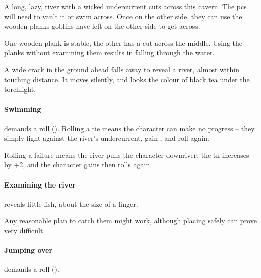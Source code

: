 \begin{multicols}{2}

A long, lazy, river with a wicked undercurrent cuts across this cavern.
The \glspl{pc} will need to vault it or swim across.
Once on the other side, they can use the wooden planks goblins have left on the other side to get across.

One wooden plank is stable, the other has a cut across the middle.
Using the planks without examining them results in  falling through the water.

\begin{boxtext}
  A wide crack in the ground ahead falls away to reveal a river, almost within touching distance.
  It moves silently, and looks the colour of black tea under the torchlight.
\end{boxtext}

\paragraph{Swimming}
demands a  roll (\tn[10]).
Rolling a tie means the character can make no progress -- they simply fight against the river's undercurrent, gain , and roll again.

Rolling a failure means the river pulls the character downriver, the \gls{tn} increases by +2, and the character gains  then rolls again.

\paragraph{Examining the river}
reveals little fish, about the size of a finger.

Any reasonable plan to catch them might work, although placing  safely can prove very difficult.

\paragraph{Jumping over}
demands a  roll (\tn[12]).



\end{multicols}
